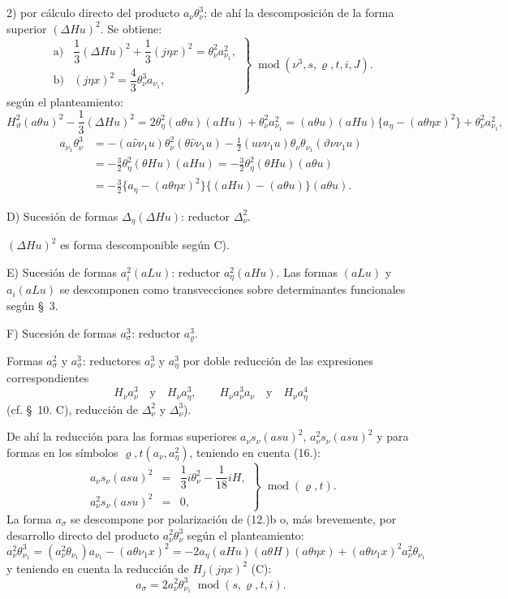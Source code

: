 \documentclass[11pt]{article}
\newcommand{\A}{\Delta}
\newcommand{\R}{\varrho}
\newcommand{\modu}[1]{\;\operatorname{mod} #1}
\begin{document}
2) por cálculo directo del producto $a_\nu\theta_\nu^3$; de ahí la descomposición de la forma superior $(\A Hu)^2$. Se obtiene:
\[
\tag{18}
\left.\begin{array}{ll}
\text{a)}&\dfrac13(\A Hu)^2+\dfrac13(j\eta x)^2=\theta_\nu^2a_{\nu_1}^2,\\[0.6em]
\text{b)}&(j\eta x)^2=\dfrac43\theta_\nu^3a_{\nu_1},
\end{array}\right\}\modu{(\nu^3,s,\R,t,i,J)}.
\]
según el planteamiento:
\[
H_\vartheta^2(a\theta u)^2-\frac13(\A Hu)^2
=2\theta_\eta^2(a\theta u)(aHu)+\theta_\nu^2a_{\nu_1}^2
=(a\theta u)(aHu)\{a_\eta-(a\theta\eta x)^2\}+\theta_\nu^2a_{\nu_1}^2,
\]
\[
\begin{aligned}
a_{\nu_1}\theta_\nu^3
&=-(a\widehat{\nu}\nu_1u)\theta_\nu^2(\theta\widehat{\nu}\nu_1u)
-\frac12(u\nu\nu_1u)\theta_\nu\theta_{\nu_1}(\vartheta\nu\nu_1u)\\
&=-\frac32\theta_\eta^2(\theta Hu)(aHu)
=-\frac32\theta_\eta^2(\theta Hu)(a\theta u)\\
&=-\frac32\{a_\eta-(a\theta\eta x)^2\}\{(aHu)-(a\theta u)\}(a\theta u).
\end{aligned}
\]

\noindent D) Sucesión de formas $\A_\eta(\A Hu)$: reductor $\A_\nu^2$.

$(\A Hu)^2$ es forma descomponible según C).

\noindent E) Sucesión de formas $a_i^2(aLu)$: reductor $a_\eta^2(aHu)$. Las formas $(aLu)$ y $a_i(aLu)$ se descomponen como transvecciones sobre determinantes funcionales según \S\ 3.

\noindent F) Sucesión de formas $a_\sigma^3$: reductor $a_\R^3$.

Formas $a_\sigma^2$ y $a_\sigma^3$: reductores $a_\nu^3$ y $a_\eta^3$ por doble reducción de las expresiones correspondientes
\[
H_\nu a_\nu^3\quad\text{y}\quad H_\nu a_\eta^3,
\qquad
H_\nu a_\nu^3a_\nu\quad\text{y}\quad H_\nu a_\eta^4
\]
(cf. \S\ 10. C), reducción de $\A_\nu^2$ y $\A_\nu^3$).

De ahí la reducción para las formas superiores $a_\nu s_\nu(asu)^2$, $a_\nu^2s_\nu(asu)^2$ y para formas en los símbolos $\R,t(a_\nu,a_\eta^2)$, teniendo en cuenta (16.):
\[
\tag{19}
\left.\begin{array}{rcl}
a_\nu s_\nu(asu)^2&=&\dfrac13 i\theta_\nu^2-\dfrac1{18}iH,\\[0.5em]
a_\nu^2s_\nu(asu)^2&=&0,
\end{array}\right\}\modu{(\R,t)}.
\]
La forma $a_\sigma$ se descompone por polarización de (12.)b o, más brevemente, por desarrollo directo del producto $a_\nu^2\theta_\nu^3$ según el planteamiento:
\[
a_\nu^2\theta_{\nu_1}^3=(a_\nu^2\theta_{\nu_1})a_{\nu_1}-(a\theta\nu_1x)^2
=-2a_\eta(aHu)(a\theta H)(a\theta\eta x)+(a\theta\nu_1x)^2a_\nu^2\theta_{\nu_1}
\]
y teniendo en cuenta la reducción de $H_j(j\eta x)^2$ (C):
\[
\tag{20}a_\sigma=2a_\nu^2\theta_{\nu_1}^3\modu{(s,\R,t,i)}.
\]
\end{document}
